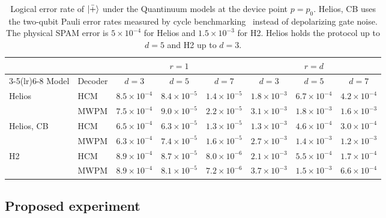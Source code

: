 \begin{table}[t]
  \caption{Logical error rate of $\left|\bar{+}\right\rangle$ under the Quantinuum models at the device point $p=p_0$. Helios, CB uses the two-qubit Pauli error rates measured by cycle benchmarking~\cite{ransford2026} instead of depolarizing gate noise. The physical SPAM error is $5\times10^{-4}$ for Helios and $1.5\times10^{-3}$ for H2. Helios holds the protocol up to $d=5$ and H2 up to $d=3$.}
  \label{tab:quantinuum}
  \setlength{\tabcolsep}{4pt}
  \begin{ruledtabular}
  \begin{tabular}{llcccccc}
    & & \multicolumn{3}{c}{$r=1$} & \multicolumn{3}{c}{$r=d$} \\
    \cmidrule(lr){3-5}\cmidrule(lr){6-8}
    Model & Decoder & $d=3$ & $d=5$ & $d=7$ & $d=3$ & $d=5$ & $d=7$ \\
    \hline
    Helios & HCM & $8.5\times10^{-4}$ & $8.4\times10^{-5}$ & $1.4\times10^{-5}$ & $1.8\times10^{-3}$ & $6.7\times10^{-4}$ & $4.2\times10^{-4}$ \\
     & MWPM & $7.5\times10^{-4}$ & $9.0\times10^{-5}$ & $2.2\times10^{-5}$ & $3.1\times10^{-3}$ & $1.8\times10^{-3}$ & $1.6\times10^{-3}$ \\
    Helios, CB & HCM & $6.5\times10^{-4}$ & $6.3\times10^{-5}$ & $1.3\times10^{-5}$ & $1.3\times10^{-3}$ & $4.6\times10^{-4}$ & $3.0\times10^{-4}$ \\
     & MWPM & $6.3\times10^{-4}$ & $7.4\times10^{-5}$ & $1.6\times10^{-5}$ & $2.7\times10^{-3}$ & $1.4\times10^{-3}$ & $1.2\times10^{-3}$ \\
    H2 & HCM & $8.9\times10^{-4}$ & $8.7\times10^{-5}$ & $8.0\times10^{-6}$ & $2.1\times10^{-3}$ & $5.5\times10^{-4}$ & $1.7\times10^{-4}$ \\
     & MWPM & $8.9\times10^{-4}$ & $8.1\times10^{-5}$ & $7.2\times10^{-6}$ & $3.7\times10^{-3}$ & $1.5\times10^{-3}$ & $6.6\times10^{-4}$ \\
  \end{tabular}
  \end{ruledtabular}
\end{table}

\subsection{Proposed experiment}

